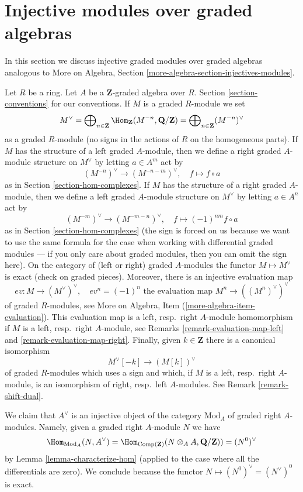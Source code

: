 \section{Injective modules over graded algebras}
\label{section-modules-noncommutative-graded}

\noindent
In this section we discuss injective graded modules over graded algebras
analogous to
More on Algebra, Section \ref{more-algebra-section-injectives-modules}.

\medskip\noindent
Let $R$ be a ring. Let $A$ be a $\mathbf{Z}$-graded algebra over $R$.
Section \ref{section-conventions} for our conventions.
If $M$ is a graded $R$-module we set
$$
M^\vee =
\bigoplus\nolimits_{n \in \mathbf{Z}}
\Hom_\mathbf{Z}(M^{-n}, \mathbf{Q}/\mathbf{Z}) =
\bigoplus\nolimits_{n \in \mathbf{Z}} (M^{-n})^\vee
$$
as a graded $R$-module (no signs in the actions of $R$ on the
homogeneous parts). If $M$ has the structure of a left graded
$A$-module, then we define a right graded $A$-module structure
on $M^\vee$ by letting $a \in A^m$ act by
$$
(M^{-n})^\vee \to (M^{-n - m})^\vee, \quad
f \mapsto f \circ a
$$
as in Section \ref{section-hom-complexes}.
If $M$ has the structure of a right graded
$A$-module, then we define a left graded $A$-module structure
on $M^\vee$ by letting $a \in A^n$ act by
$$
(M^{-m})^\vee \to (M^{-m - n})^\vee, \quad
f \mapsto (-1)^{nm}f \circ a
$$
as in Section \ref{section-hom-complexes} (the sign is forced on
us because we want to use the same formula for the case
when working with differential graded modules --- if you only
care about graded modules, then you can omit the sign here).
On the category of (left or right) graded $A$-modules the
functor $M \mapsto M^\vee$ is exact (check on graded pieces).
Moreover, there is an injective evaluation map
$$
ev : M \longrightarrow (M^\vee)^\vee, \quad
ev^n = (-1)^n \text{ the evaluation map }M^n \to ((M^n)^\vee)^\vee
$$
of graded $R$-modules, see
More on Algebra, Item (\ref{more-algebra-item-evaluation}).
This evaluation map is a left, resp.\ right $A$-module homomorphism
if $M$ is a left, resp.\ right $A$-module, see
Remarks \ref{remark-evaluation-map-left} and \ref{remark-evaluation-map-right}.
Finally, given $k \in \mathbf{Z}$ there is a canonical isomorphism
$$
M^\vee[-k] \longrightarrow (M[k])^\vee
$$
of graded $R$-modules which uses a sign and which, if
$M$ is a left, resp.\ right $A$-module, is an isomorphism
of right, resp.\ left $A$-modules. See Remark \ref{remark-shift-dual}.

\medskip\noindent
We claim that $A^\vee$ is an injective object of the category
$\text{Mod}_A$ of graded right $A$-modules. Namely, given a graded
right $A$-module $N$ we have
$$
\Hom_{\text{Mod}_A}(N, A^\vee) =
\Hom_{\text{Comp}(\mathbf{Z})}(N \otimes_A A, \mathbf{Q}/\mathbf{Z})) =
(N^0)^\vee
$$
by Lemma \ref{lemma-characterize-hom}
(applied to the case where all the differentials are zero).
We conclude because the functor $N \mapsto (N^0)^\vee = (N^\vee)^0$
is exact.

